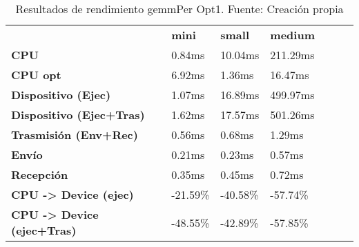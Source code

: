 \begin{table}[H]
    \centering
    \begin{tabular}{lllllll}
    \rowcolor[HTML]{DAE8FC} \ &  \textbf{mini} &  \textbf{	small} &  \textbf{	medium} \\
    \cellcolor[HTML]{DAE8FC} \textbf{CPU} & 0.84ms & 	10.04ms & 	211.29ms \\
    \rowcolor[HTML]{EFEFEF} \cellcolor[HTML]{DAE8FC} \textbf{CPU opt} & 6.92ms & 	1.36ms & 	16.47ms \\
    \cellcolor[HTML]{DAE8FC} \textbf{Dispositivo (Ejec)} & 1.07ms & 	16.89ms & 	499.97ms \\
    \rowcolor[HTML]{EFEFEF} \cellcolor[HTML]{DAE8FC} \textbf{Dispositivo (Ejec+Tras)} & 1.62ms & 	17.57ms & 	501.26ms \\
    \cellcolor[HTML]{DAE8FC} \textbf{Trasmisión (Env+Rec)} & 0.56ms & 	0.68ms & 	1.29ms \\
    \rowcolor[HTML]{EFEFEF} \cellcolor[HTML]{DAE8FC} \textbf{Envío} & 0.21ms & 	0.23ms & 	0.57ms \\
    \cellcolor[HTML]{DAE8FC} \textbf{Recepción} & 0.35ms & 	0.45ms & 	0.72ms \\
    \rowcolor[HTML]{EFEFEF} \cellcolor[HTML]{DAE8FC} \textbf{CPU -> Device (ejec)} & -21.59\% & 	-40.58\% & 	-57.74\% \\
    \cellcolor[HTML]{DAE8FC} \textbf{CPU -> Device (ejec+Tras)} & -48.55\% & 	-42.89\% & 	-57.85\% \\
    \end{tabular}
    \caption[Resultados de rendimiento gemmPer Opt1]{{Resultados de rendimiento gemmPer Opt1. Fuente: Creación propia}}
    \label{table_test_gemmPer_Opt1_hw_performanceResults}
\end{table}